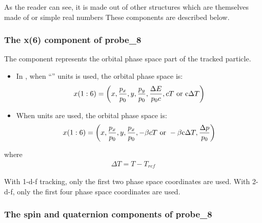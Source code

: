 \documentclass[english,12pt,article]{article} %
\begin{document}
As the reader can see, it is made out of other structures which are themselves made of  or simple real numbers These components are described below.

\subsubsection{The x(6) component of probe_8}\label{sec:codetypex6}

The  component represents the orbital phase space part of the tracked particle.
 
 \begin{itemize}
\item In , when ``'' units is used, the orbital phase space is: 
%
\begin{align} x(1:6)=
\left({x,{{p}_{x} \over {p}_{0}},y,{{p}_{y} \over {p}_{0}},{\Delta E \over {p}_{0}c},cT~{\rm o}{\rm r}~{\rm c}\Delta T}\right) \end{align}
\item When  units are used, the orbital phase space is:
%
\begin{align} x(1:6)=
\left({x,{{p}_{x} \over {p}_{0}},y,{{p}_{x} \over {p}_{0}},-\beta cT~{\rm o}{\rm r}~-\beta {\rm c}\Delta T,{\Delta p \over {p}_{0}}}\right) \end{align}
\end{itemize}
where
%
\begin{align} \Delta T=
T-{T}_{ref} \end{align}

With 1-d-f tracking, only the first two phase space coordinates are used. With 2-d-f, only the first four phase space coordinates are used.

\subsubsection{The spin and quaternion components of probe_8}\label{sec:code spin}
\end{document}
